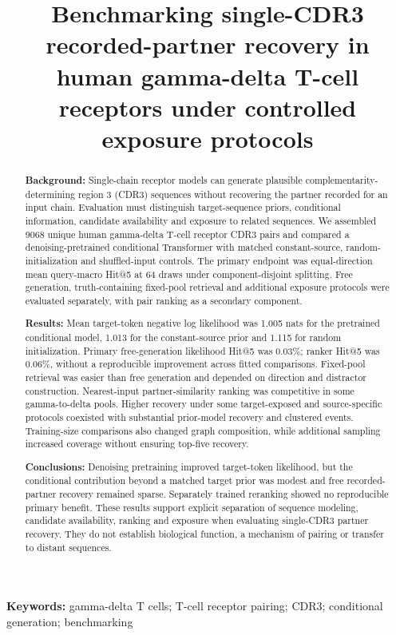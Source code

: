 \documentclass[a4paper,11pt]{article}
\title{Benchmarking single-CDR3 recorded-partner recovery in human gamma-delta T-cell receptors under controlled exposure protocols}
\author{}
\date{}
\begin{document}
\maketitle
\begin{abstract}
\textbf{Background:} Single-chain receptor models can generate plausible
complementarity-determining region 3 (CDR3) sequences without recovering the
partner recorded for an input chain. Evaluation must distinguish target-sequence
priors, conditional information, candidate availability and exposure to related
sequences. We assembled 9068 unique human gamma-delta T-cell receptor CDR3
pairs and compared a denoising-pretrained conditional Transformer with matched
constant-source, random-initialization and shuffled-input controls. The primary
endpoint was equal-direction mean query-macro Hit@5 at 64 draws under
component-disjoint splitting. Free generation, truth-containing fixed-pool
retrieval and additional exposure protocols were evaluated separately, with
pair ranking as a secondary component.

\textbf{Results:} Mean target-token negative log likelihood was 1.005 nats for
the pretrained conditional model, 1.013 for the constant-source prior and 1.115
for random initialization. Primary free-generation likelihood Hit@5 was
0.03\%; ranker Hit@5 was 0.06\%, without a reproducible improvement across
fitted comparisons. Fixed-pool retrieval was easier than free generation and
depended on direction and distractor construction. Nearest-input
partner-similarity ranking was competitive in some gamma-to-delta pools.
Higher recovery under some target-exposed and source-specific protocols
coexisted with substantial prior-model recovery and clustered events.
Training-size comparisons also changed graph composition, while additional
sampling increased coverage without ensuring top-five recovery.

\textbf{Conclusions:} Denoising pretraining improved target-token likelihood,
but the conditional contribution beyond a matched target prior was modest and
free recorded-partner recovery remained sparse. Separately trained reranking
showed no reproducible primary benefit. These results support explicit
separation of sequence modeling, candidate availability, ranking and exposure
when evaluating single-CDR3 partner recovery. They do not establish biological
function, a mechanism of pairing or transfer to distant sequences.
\end{abstract}

\noindent\textbf{Keywords:} gamma-delta T cells; T-cell receptor pairing; CDR3;
conditional generation; benchmarking
\end{document}
